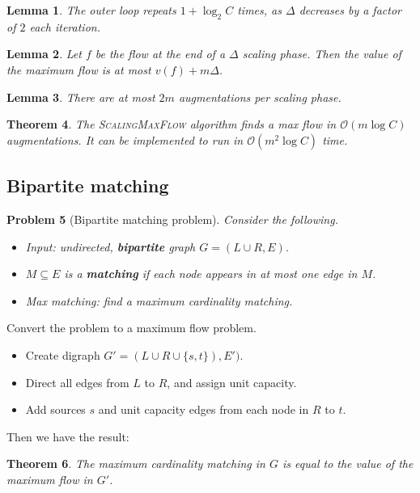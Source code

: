 \documentclass[10pt, oneside, reqno]{amsart}
\theoremstyle{plain}%
\newtheorem{thm}{Theorem}[section]
\newtheorem{prob}[thm]{Problem}
\newtheorem{lem}[thm]{Lemma}
\theoremstyle{definition}
\theoremstyle{remark}
\newcommand{\bigo}[1]{\mathcal{O}(#1)}
\begin{document}
\begin{lem}
	The outer loop repeats $1 + \log_2{C}$ times, as $\Delta$ decreases by a factor of $2$ each iteration.
\end{lem}

\begin{lem}
	Let $f$ be the flow at the end of a $\Delta$ scaling phase.  Then the value of the maximum flow is at most $v(f) + m \Delta$. 
\end{lem}

\begin{lem}
	There are at most $2m$ augmentations per scaling phase.
\end{lem}
\begin{thm}
	The \textsc{ScalingMaxFlow} algorithm finds a max flow in $\bigo{m \log C}$ augmentations.  It can be implemented to run in $\bigo{m^2 \log C}$ time.
\end{thm}


\subsection{Bipartite matching} %
\label{sub:bipartite_matching}
\begin{prob}[Bipartite matching problem]
	Consider the following.
	\begin{itemize}
		\item Input: undirected, \textbf{bipartite} graph $G = (L \cup R, E)$.
		\item $M \subseteq E$ is a \textbf{matching} if each node appears in at most one edge in $M$.
		\item Max matching: find a maximum cardinality matching.
	\end{itemize}
\end{prob}

Convert the problem to a maximum flow problem.
\begin{itemize}
	\item Create digraph $G' = (L \cup R \cup \{s,t\}), E')$.
	\item Direct all edges from $L$ to $R$, and assign unit capacity.
	\item Add sources $s$ and unit capacity edges from each node in $R$ to $t$.
\end{itemize}

Then we have the result:
\begin{thm}
	The maximum cardinality matching in $G$ is equal to the value of the maximum flow in $G'$.
\end{thm}
\end{document}
